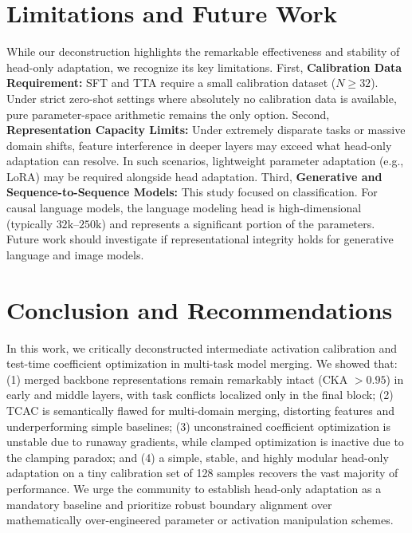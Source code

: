 \documentclass{article}
\theoremstyle{plain}
\theoremstyle{definition}
\theoremstyle{remark}
\begin{document}
\section{Limitations and Future Work}
\label{sec:limitations}

While our deconstruction highlights the remarkable effectiveness and stability of head-only adaptation, we recognize its key limitations. First, \textbf{Calibration Data Requirement:} SFT and TTA require a small calibration dataset ($N \ge 32$). Under strict zero-shot settings where absolutely no calibration data is available, pure parameter-space arithmetic remains the only option. Second, \textbf{Representation Capacity Limits:} Under extremely disparate tasks or massive domain shifts, feature interference in deeper layers may exceed what head-only adaptation can resolve. In such scenarios, lightweight parameter adaptation (e.g., LoRA) may be required alongside head adaptation. Third, \textbf{Generative and Sequence-to-Sequence Models:} This study focused on classification. For causal language models, the language modeling head is high-dimensional (typically $32\text{k}$--$250\text{k}$) and represents a significant portion of the parameters. Future work should investigate if representational integrity holds for generative language and image models.

\section{Conclusion and Recommendations}
\label{sec:conclusion}

In this work, we critically deconstructed intermediate activation calibration and test-time coefficient optimization in multi-task model merging. We showed that: (1) merged backbone representations remain remarkably intact (CKA $> 0.95$) in early and middle layers, with task conflicts localized only in the final block; (2) TCAC is semantically flawed for multi-domain merging, distorting features and underperforming simple baselines; (3) unconstrained coefficient optimization is unstable due to runaway gradients, while clamped optimization is inactive due to the clamping paradox; and (4) a simple, stable, and highly modular head-only adaptation on a tiny calibration set of 128 samples recovers the vast majority of performance. We urge the community to establish head-only adaptation as a mandatory baseline and prioritize robust boundary alignment over mathematically over-engineered parameter or activation manipulation schemes.
\end{document}

